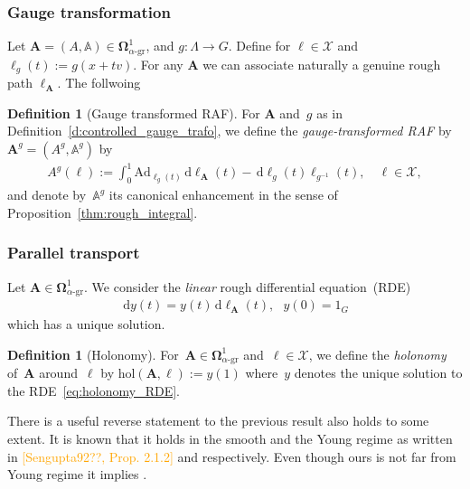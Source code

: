 \documentclass[12pt]{article}
\numberwithin{equation}{section}
\theoremstyle{definition}
\newtheorem{definition}[theorem]{Definition}
\theoremstyle{remark}
\newcommand{\hol}{\mathrm{hol}}
\newcommand{\Ad}{\mathrm{Ad}}
\newcommand{\dif}{\,\mathrm{d}}
\newcommand{\1}{\mathbf 1}
\newcommand{\<}{\langle}
\renewcommand{\>}{\rangle}
\newcommand{\gr}{\text{-}\mathrm{gr}}
\newcommand{\green}[1]{\textcolor{darkgreen}{#1}}
\newcommand{\orange}[1]{\textcolor{orange}{#1}}
\newcommand{\bfA}{\mathbf A}
\newcommand{\bA}{\mathbb A}
\newcommand{\bfOmega}{\boldsymbol{\Omega}}
\newcommand{\cX}{\mathcal X}
\begin{document}
\subsubsection{Gauge transformation}\label{sec:gauge_transformation}
Let $\bfA=(A,\bA)\in \bfOmega^1_{\alpha\gr}$, and $g:\Lambda\to G$. Define for $\ell\in\cX$ and $\ell_g(t):=g(x+tv)$. For any $\bfA$ we can associate naturally a genuine rough path $\ell_\bfA$. The follwoing
\begin{definition}[Gauge transformed RAF]
	For $\bfA$ and~$g$ as in Definition~\ref{d:controlled_gauge_trafo}, we define the \emph{gauge-transformed RAF} by~$\bfA^g = (A^g,\bA^g)$ by
	\begin{align}\label{e:gauge_trafo_connection:2}
		A^g(\ell):=\int^1_0 \Ad_{\ell_g(t)}\dif\ell_{\bfA}(t)-\dif\ell_g(t)\ell_{g^{-1}}(t), \quad \ell \in \cX,
	\end{align}
	and denote by~$\bA^g$ its canonical enhancement in the sense of Proposition~\ref{thm:rough_integral}.
\end{definition}



\subsubsection{Parallel transport}
Let $\bfA\in\bfOmega^1_{\alpha\gr}$. We consider the \emph{linear} rough differential equation~(RDE)
%
\begin{align}\label{eq:holonomy_RDE}
\dif y(t)=y(t)\dif\ell_\bfA(t), \ \ \ y(0)=1_G
\end{align}
%
which has a unique solution. 

\begin{definition}[Holonomy]\label{def:holonomy}
	For~$\bfA\in\bfOmega^1_{\alpha\gr}$ and~$\ell \in \cX$, we define the \emph{holonomy} of~$\bfA$ around~$\ell$ by $\hol(\bfA,\ell) := y(1)$ where~$y$ denotes the unique solution to the RDE~\eqref{eq:holonomy_RDE}.
\end{definition}





%

%


There is a useful reverse statement to the previous result also holds to some extent. It is known that it holds in the smooth and the Young regime as written in \orange{ [Sengupta92??, Prop. 2.1.2]} and \green{\cite[Prop. 3.35]{CCHS2d}} respectively. Even though ours is not far from Young regime it implies \green{\cite[Prop. 3.35]{CCHS2d}}. 
%
\end{document}
